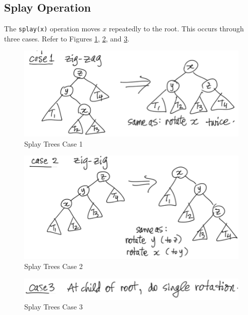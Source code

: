                 \subsection{Splay Operation} %
                \label{sub:splay_operation}
                    The \verb|splay(x)| operation moves $x$ repeatedly to the root.
                    This occurs through three cases.
                    Refer to Figures \ref{fig:splay_trees_case_1}, \ref{fig:splay_trees_case_2}, and \ref{fig:splay_trees_case_3}.
                    \begin{figure}[h]
                        \centering
                        \includegraphics{images/splay_trees_case_1.png}
                        \caption{Splay Trees Case 1}
                        \label{fig:splay_trees_case_1}
                    \end{figure}
                    \begin{figure}[h]
                        \centering
                        \includegraphics{images/splay_trees_case_2.png}
                        \caption{Splay Trees Case 2}
                        \label{fig:splay_trees_case_2}
                    \end{figure}
                    \begin{figure}[h]
                        \centering
                        \includegraphics{images/splay_trees_case_3.png}
                        \caption{Splay Trees Case 3}
                        \label{fig:splay_trees_case_3}
                    \end{figure}
